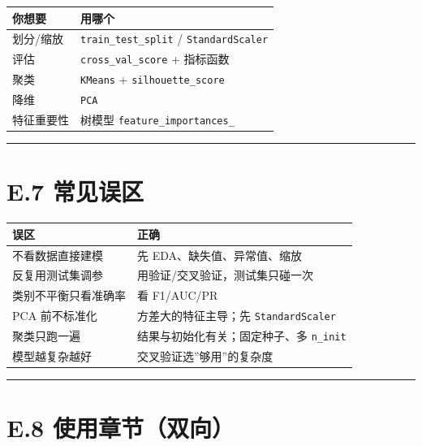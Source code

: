 {\def\LTcaptype{none} %
\begin{longtable}[]{@{}ll@{}}
\toprule\noalign{}
你想要 & 用哪个 \\
\midrule\noalign{}
\endhead
\bottomrule\noalign{}
\endlastfoot
划分/缩放 & \texttt{train\_test\_split} / \texttt{StandardScaler} \\
评估 & \texttt{cross\_val\_score} + 指标函数 \\
聚类 & \texttt{KMeans} + \texttt{silhouette\_score} \\
降维 & \texttt{PCA} \\
特征重要性 & 树模型 \texttt{feature\_importances\_} \\
\end{longtable}
}

\begin{center}\rule{0.5\linewidth}{0.5pt}\end{center}

\section{E.7 常见误区}\label{e.7-ux5e38ux89c1ux8befux533a}

{\def\LTcaptype{none} %
\begin{longtable}[]{@{}ll@{}}
\toprule\noalign{}
误区 & 正确 \\
\midrule\noalign{}
\endhead
\bottomrule\noalign{}
\endlastfoot
不看数据直接建模 & 先 EDA、缺失值、异常值、缩放 \\
反复用测试集调参 & 用验证/交叉验证，测试集只碰一次 \\
类别不平衡只看准确率 & 看 F1/AUC/PR \\
PCA 前不标准化 & 方差大的特征主导；先 \texttt{StandardScaler} \\
聚类只跑一遍 & 结果与初始化有关；固定种子、多 \texttt{n\_init} \\
模型越复杂越好 & 交叉验证选''够用''的复杂度 \\
\end{longtable}
}

\begin{center}\rule{0.5\linewidth}{0.5pt}\end{center}

\section{E.8
使用章节（双向）}\label{e.8-ux4f7fux7528ux7ae0ux8282ux53ccux5411}

